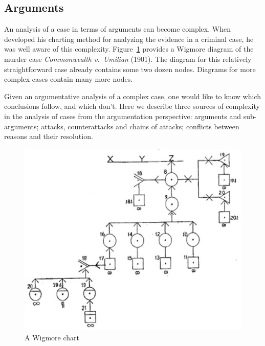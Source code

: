 \documentclass[10pt]{article}
\begin{document}
\subsection{Arguments}
\label{sec:coh-arg}

An analysis of a case in terms of arguments can become complex. When \citet{wigmore1913} developed his charting method 
for analyzing the evidence in a criminal case, %
he was well aware of this complexity. 
Figure~\ref{fig:wigmore} provides %
a Wigmore diagram of %
the murder case \textit{Commonwealth v.\ Umilian} (1901). 
 The diagram for this relatively straightforward case already contains some two dozen nodes. 
 Diagrams for more complex cases contain many more nodes.
 
 Given an argumentative analysis of a complex case, one would like to know which conclusions follow, and which don't. 
  Here we describe three sources of complexity in the analysis
  of cases from the argumentation perspective: arguments and sub-arguments; attacks, counterattacks and chains of attacks;
  conflicts between reasons and their resolution.
  
  
  
 
 

\begin{figure}[bt]
	\centering
		\includegraphics[scale=0.7]{img/wigmore.jpg}
\caption{A Wigmore chart\label{fig:wigmore}}
\end{figure}
\end{document}
